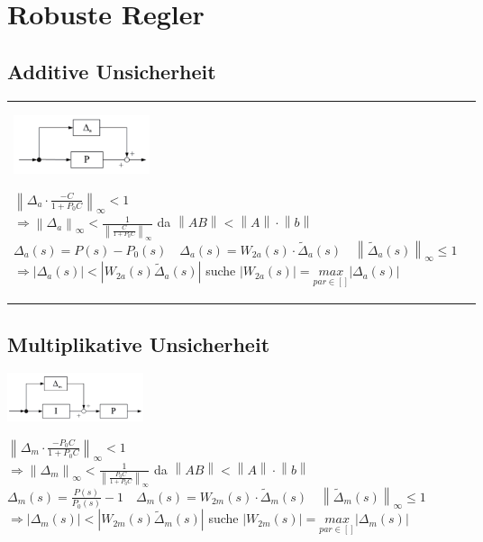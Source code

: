 \section{Robuste Regler}

\subsection{Additive Unsicherheit}

\begin{tabular}{ll}
	\parbox{5cm}{
	\includegraphics[width=4cm]{./bilder/rob_add.png}}
	\parbox{15cm}{
		$ \left \lVert \Delta_a \cdot \frac{-C}{1+P_0 C} \right\rVert_\infty < 1 $\\
		$ \Rightarrow \left \lVert \Delta_a \right\rVert_\infty < \frac{1}{\left \lVert \frac{C}{1+P_0 C} \right\rVert_\infty}$ da $\left \lVert AB \right\rVert < \left \lVert A \right\rVert \cdot \left \lVert b \right\rVert$\\
		$\Delta_a(s)=P(s) - P_0(s) \quad \Delta_a(s)=W_{2a}(s) \cdot \tilde{\Delta}_a(s) \quad \left \lVert \tilde{\Delta}_a(s) \right\rVert_\infty \leq 1$\\
		$ \Rightarrow \left| \Delta_a(s) \right| < \left| W_{2a}(s) \tilde{\Delta}_a(s) \right| $ suche $\left| W_{2a}(s) \right|  = \underset{par\in[]}{max} \left| \Delta_a(s) \right| $
		}
\end{tabular}		

\subsection{Multiplikative Unsicherheit}
	\parbox{5cm}{
	\includegraphics[width=4cm]{./bilder/rob_mult.png}}
	\parbox{15cm}{
		$ \left \lVert \Delta_m \cdot \frac{-P_0C}{1+P_0 C} \right\rVert_\infty < 1 $\\
		$ \Rightarrow \left \lVert \Delta_m \right\rVert_\infty < \frac{1}{\left \lVert \frac{P_0C}{1+P_0 C} \right\rVert_\infty}$ da $\left \lVert AB \right\rVert < \left \lVert A \right\rVert \cdot \left \lVert b \right\rVert$\\
		$\Delta_m(s)=\frac{P(s)}{P_0(s)} - 1 \quad \Delta_m(s)=W_{2m}(s) \cdot \tilde{\Delta}_m(s) \quad \left \lVert \tilde{\Delta}_m(s) \right\rVert_\infty \leq 1$\\
		$\Rightarrow \left| \Delta_m(s) \right| < \left| W_{2m}(s) \tilde{\Delta}_m(s) \right| $ suche $\left| W_{2m}(s) \right|  = \underset{par\in[]}{max} \left| \Delta_m(s) \right| $
		}
		
